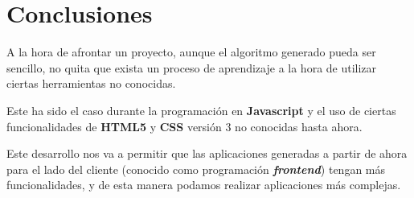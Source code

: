 \documentclass{\ClassPath/viu-tfm-template}
\begin{document}
\chapter{Conclusiones}

A la hora de afrontar un proyecto, aunque el algoritmo generado pueda ser sencillo, no quita que exista un proceso de aprendizaje a la hora de utilizar ciertas herramientas no conocidas.

Este ha sido el caso durante la programación en \textbf{Javascript} y el uso de ciertas funcionalidades de \textbf{HTML5} y \textbf{CSS} versión 3 no conocidas hasta ahora.

Este desarrollo nos va a permitir que las aplicaciones generadas a partir de ahora para el lado del cliente (conocido como programación \textbf{\textit{frontend}}) tengan más funcionalidades, y de esta manera podamos realizar aplicaciones más complejas.


\end{document}
